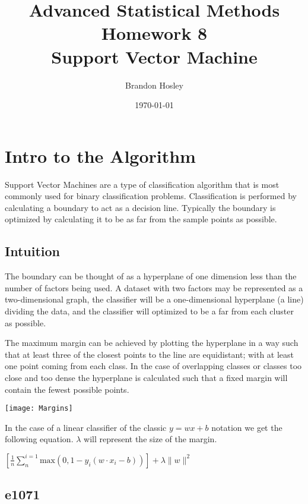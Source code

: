 \documentclass[a4paper,man,natbib]{apa6}
\title{Advanced Statistical Methods Homework 8 \\ Support Vector Machine}
\author{Brandon Hosley}
\date{\today}
\affiliation{University of Illinois - Springfield}
\begin{document}
\maketitle
\singlespacing

\section{Intro to the Algorithm}

Support Vector Machines are a type of classification algorithm that is most commonly used for binary classification problems. Classification is performed by calculating a boundary to act as a decision line. Typically the boundary is optimized by calculating it to be as far from the sample points as possible.

\subsection{Intuition}

The boundary can be thought of as a hyperplane of one dimension less than the number of factors being used. A dataset with two factors may be represented as a two-dimensional graph, the classifier will be a one-dimensional hyperplane (a line) dividing the data, and the classifier will optimized to be a far from each cluster as possible.

The maximum margin can be achieved by plotting the hyperplane in a way such that at least three of the closest points to the line are equidistant; with at least one point coming from each class. In the case of overlapping classes or classes too close and too dense the hyperplane is calculated such that a fixed margin will contain the fewest possible points.

\begin{center}
	\texttt{[image: Margins]}
\end{center}

In the case of a linear classifier of the classic $y=wx + b$ notation we get the following equation. $\lambda$ will represent the size of the margin.

\vspace{1em}
$ \left[ \frac{1}{n} \sum_{n}^{i=1} \text{max} (0,1-y_i(w \cdot x_i-b)) \right] + \lambda \|w\|^2 $
\vspace{1em}

\subsection{e1071}
\end{document}
